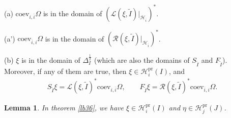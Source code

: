 \documentclass[11pt,b5paper,notitlepage]{article}
\theoremstyle{definition}
\theoremstyle{plain}
\newtheorem{lm}[df]{Lemma}
\newcommand{\mc}{\mathcal}
\newcommand{\wtd}{\widetilde}
\newcommand{\ovl}{\overline}
\newcommand{\coev}{\mathrm{coev}}
\newcommand{\scr}{\mathscr}
\newcommand{\pr}{\mathrm{pr}}
\numberwithin{equation}{subsection}
\begin{document}
(a) $\coev_{i,\ovl i}\Omega$ is in the domain of $(\scr L(\xi,\wtd I)|_{\mc H_{\ovl i}})^*$.

(a') $\coev_{\ovl i,i}\Omega$ is in the domain of $(\scr R(\xi,\wtd I)|_{\mc H_{\ovl i}})^*$.

(b) $\xi$ is in the domain of $\Delta_I^{\frac 12}$ (which are also the domains of $S_{\wtd I}$ and  $F_{\wtd I}$).\\
Moreover, if any of them are true, then   $\xi\in\mc H_i^\pr(I)$, and
\begin{align}
S_{\wtd I}\xi=\scr L(\xi,\wtd I)^*\coev_{i,\ovl i}\Omega,\qquad F_{\wtd I}\xi=\scr R(\xi,\wtd I)^*\coev_{\ovl i,i}\Omega.\label{eq32}
\end{align} 

\begin{lm}\label{lb37}
In theorem \ref{lb36}, we have $\xi\in\mc H_i^\pr(I)$ and $\eta\in\mc H_j^\pr(J)$.
\end{lm}
\end{document}

